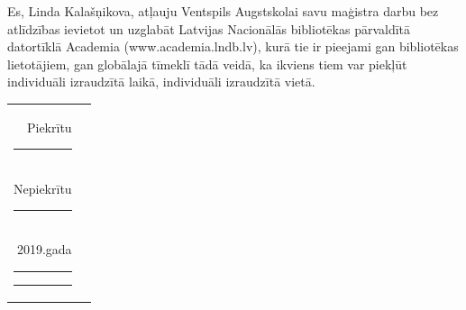 \documentclass[12pt,paper=A4]{report}
\def\defAutors{Linda Kalašņikova}
\def\defGads{2019}
\begin{document}
Es, \defAutors , atļauju Ventspils Augstskolai savu maģistra darbu bez atlīdzības ievietot un 
uzglabāt Latvijas Nacionālās bibliotēkas pārvaldītā datortīklā Academia (www.academia.lndb.lv), 
kurā tie ir pieejami gan bibliotēkas lietotājiem, gan globālajā tīmeklī tādā veidā, 
ka ikviens tiem var piekļūt individuāli izraudzītā laikā, individuāli izraudzītā vietā.

\vspace{1in}
\begin{tabular}{@{}r@{}l@{}}
  \parbox[c]{0.7\textwidth}{} Piekrītu \rule{1cm}{0.2pt}&
  \parbox[t]{0.2\textwidth}{\centering
  \mbox{}\hrulefill\vspace{-0.8em}\\
  {}\vspace{2em}}\\

  \parbox[c]{0.7\textwidth}{} Nepiekrītu \rule{1cm}{0.2pt}&
   \parbox[t]{0.2\textwidth}{ \centering
  \mbox{}\hrulefill\vspace{-0.8em}\\
  {}\vspace{2em}}\\
  
  \parbox[c]{0.7\textwidth}{\defGads.gada \rule{1cm}{0.2pt}\hspace{3mm}\rule{3cm}{0.2pt}}&
\end{tabular}

\label{LastPage}
    
    
\end{document}
